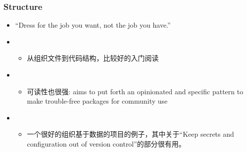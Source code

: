 \documentclass[letterpaper,10pt,english]{sphinxmanual}
\begin{document}
\subsubsection{Structure}
\label{\detokenize{resource/programing/python_write_your_project:structure}}\begin{itemize}
\item {} 
“Dress for the job you want, not the job you have.”

\item {} 
\begin{itemize}
\item {} 
从组织文件到代码结构，比较好的入门阅读

\end{itemize}

\item {} 
\begin{itemize}
\item {} 
可读性也很强: aims to put forth an opinionated and specific
pattern to make trouble-free packages for community use

\end{itemize}

\item {} 
\begin{itemize}
\item {} 
一个很好的组织基于数据的项目的例子，其中关于“Keep secrets and
configuration out of version control”的部分很有用。

\end{itemize}

\end{itemize}
\end{document}
